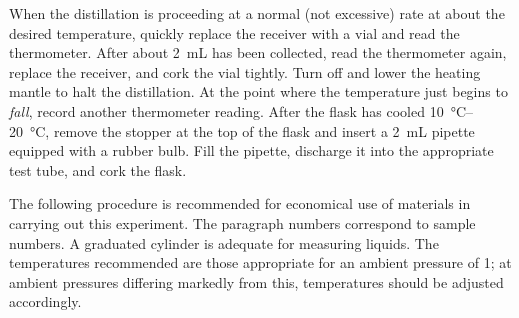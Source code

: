 When the distillation is proceeding at a normal (not excessive) rate at about the desired temperature, quickly replace the receiver with a vial and read the thermometer. 
After about \qty{2}{\mL} has been collected, read the thermometer again, replace the receiver, and cork the vial tightly. 
Turn off and lower the heating mantle to halt the distillation. 
At the point where the temperature just begins to \emph{fall}, record another thermometer reading. 
After the flask has cooled \qtyrange{10}{20}{\celsius}, remove the stopper at the top of the flask and insert a \qty{2}{\mL} pipette equipped with a rubber bulb. 
Fill the pipette, discharge it into the appropriate test tube, and cork the flask. 

The following procedure is recommended for economical use of materials in carrying out this experiment. 
The paragraph numbers correspond to sample numbers. 
A graduated cylinder is adequate for measuring liquids. 
The temperatures recommended are those appropriate for an ambient pressure of \qty{1}{\atm}; at ambient pressures differing markedly from this, temperatures should be adjusted accordingly. 
